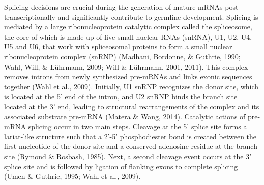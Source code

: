\documentclass[12pt,oneside]{reedthesis}
\begin{document}
Splicing decisions are crucial during the generation of mature mRNAs
post-transcriptionally and significantly contribute to germline
development. Splicing is mediated by a large ribonucleoprotein catalytic
complex called the spliceosome, the core of which is made up of five
small nuclear RNAs (snRNA), U1, U2, U4, U5 and U6, that work with
spliceosomal proteins to form a small nuclear ribonucleoprotein complex
(snRNP) (Madhani, Bordonne, \& Guthrie, 1990; Wahl, Will, \& Lührmann, 2009; Will \& Lührmann, 2001, 2011). This
complex removes introns from newly synthesized pre-mRNAs and links
exonic sequences together (Wahl et al., 2009). Initially, U1 snRNP recognizes
the donor site, which is located at the 5' end of the intron, and U2
snRNP binds the branch site located at the 3' end, leading to structural
rearrangements of the complex and its associated substrate pre-mRNA
(Matera \& Wang, 2014). Catalytic actions of pre-mRNA splicing occur in two
main steps. Cleavage at the 5' splice site forms a lariat-like structure
such that a 2'-5' phosphodiester bond is created between the first
nucleotide of the donor site and a conserved adenosine residue at the
branch site (Rymond \& Rosbash, 1985). Next, a second cleavage event occurs at
the 3' splice site and is followed by ligation of flanking exons to
complete splicing (Umen \& Guthrie, 1995; Wahl et al., 2009).
\end{document}
